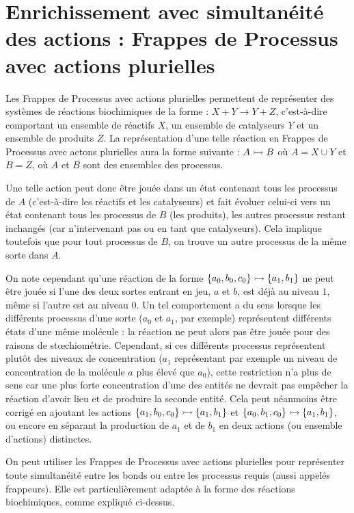\section{Enrichissement avec simultanéité des actions : Frappes de Processus avec actions plurielles}


Les Frappes de Processus avec actions plurielles permettent de représenter des systèmes
de réactions biochimiques de la forme : $X + Y \rightarrow Y + Z$,
c'est-à-dire comportant un ensemble de réactifs $X$, un ensemble de catalyseurs $Y$
et un ensemble de produits $Z$.
La représentation d'une telle réaction en Frappes de Processus avec actons plurielles
aura la forme suivante :
$\mbox{$A \rightarrowtail B$}$ où $A = X \cup Y$ et $B = Z$,
où $A$ et $B$ sont des ensembles des processus.

Une telle action peut donc être jouée dans un état contenant tous les processus de $A$
(c'est-à-dire les réactifs et les catalyseurs)
et fait évoluer celui-ci vers un état contenant tous les processus de $B$ (les produits),
les autres processus restant inchangés (car n'intervenant pas ou en tant que catalyseurs).
Cela implique toutefois que pour tout processus de $B$, on trouve un autre processus de la même
sorte dans $A$.

On note cependant qu'une réaction de la forme $\mbox{$\{ a_0, b_0, c_0 \} \rightarrowtail \{ a_1, b_1 \}$}$
ne peut être jouée si l'une des deux sortes entrant en jeu, $a$ et $b$, est déjà au niveau $1$,
même si l'autre est au niveau $0$.
Un tel comportement a du sens lorsque les différents processus d'une sorte
($a_0$ et $a_1$, par exemple)
représentent différents états d'une même molécule :
la réaction ne peut alors pas être jouée pour des raisons de stœchiométrie.
Cependant, si ces différents processus représentent plutôt des niveaux de concentration
($a_1$ représentant par exemple un niveau de concentration de la molécule $a$ plus élevé que $a_0$),
cette restriction n'a plus de sens car une plus forte concentration d'une des entités
ne devrait pas empêcher la réaction d'avoir lieu et de produire la seconde entité.
Cela peut néanmoins être corrigé en ajoutant les actions
$\mbox{$\{ a_1, b_0, c_0 \} \rightarrowtail \{ a_1, b_1 \}$}$ et
$\mbox{$\{ a_0, b_1, c_0 \} \rightarrowtail \{ a_1, b_1 \}$}$,
ou encore en séparant la production de $a_1$ et de $b_1$ en deux actions (ou ensemble d'actions)
distinctes.

On peut utiliser les Frappes de Processus avec actions plurielles pour représenter toute simultanéité
entre les bonds ou entre les processus requis (aussi appelés frappeurs).
Elle est particulièrement adaptée à la forme des réactions biochimiques,
comme expliqué ci-dessus.

